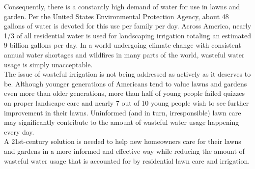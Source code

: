\documentclass[]{article}
\begin{document}
	Consequently, there is a constantly high demand of water for use in lawns and garden. Per the United States Environmental Protection Agency, about 48 gallons of water is devoted for this use per family per day. Across America, nearly 1/3 of all residential water is used for landscaping irrigation totaling an estimated 9 billion gallons per day\cite{epa_outdoor_nodate}. In a world undergoing climate change with consistent annual water shortages and wildfires in many parts of the world, wasteful water usage is simply unacceptable. \\
	
	The issue of wasteful irrigation is not being addressed as actively as it deserves to be. Although younger generations of Americans tend to value lawns and gardens even more than older generations, more than half of young people failed quizzes on proper landscape care and nearly 7 out of 10 young people wish to see further improvement in their lawns\cite{noauthor_new_2016}. Uninformed (and in turn, irresponsible) lawn care may significantly contribute to the amount of wasteful water usage happening every day.  \\
	
	A 21st-century solution is needed to help new homeowners care for their lawns and gardens in a more informed and effective way while reducing the amount of wasteful water usage that is accounted for by residential lawn care and irrigation.
	
\end{document}
